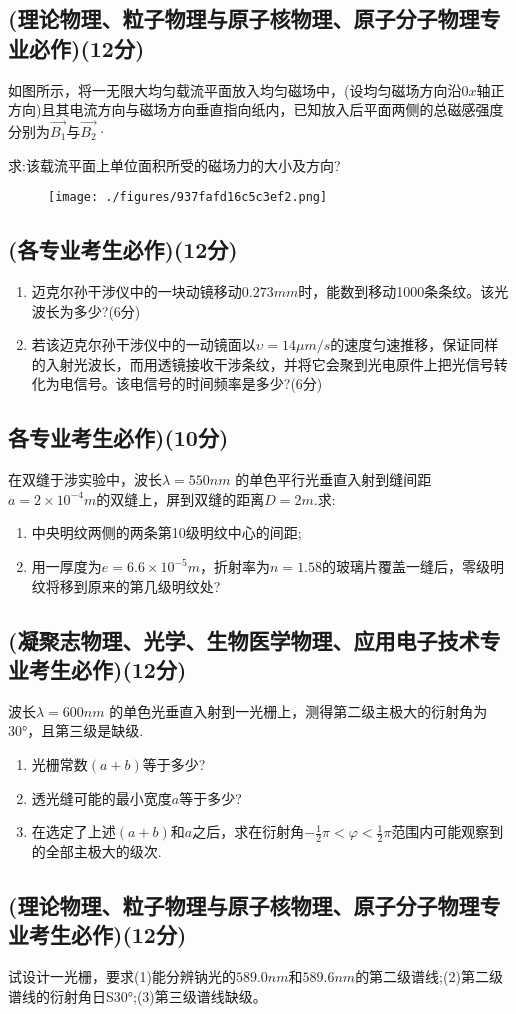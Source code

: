 \subsection{(理论物理、粒子物理与原子核物理、原子分子物理专业必作)(12分)}
如图所示，将一无限大均匀载流平面放入均匀磁场中，(设均匀磁场方向沿$0x$轴正方向)且其电流方向与磁场方向垂直指向纸内，已知放入后平面两侧的总磁感强度分别为$\vec{B_1}$与$\vec{B_2}$·

求:该载流平面上单位面积所受的磁场力的大小及方向?
\begin{figure}[ht]
\centering
\texttt{[image: ./figures/937fafd16c5c3ef2.png]}
\caption{} \label{fig_CD07_2}
\end{figure}
\subsection{(各专业考生必作)(12分)}
\begin{enumerate}
\item 迈克尔孙干涉仪中的一块动镜移动$0.273mm$时，能数到移动1000条条纹。该光波长为多少?(6分)
\item 若该迈克尔孙干涉仪中的一动镜面以$\upsilon=14\mu m/s$的速度匀速推移，保证同样的入射光波长，而用透镜接收干涉条纹，并将它会聚到光电原件上把光信号转化为电信号。该电信号的时间频率是多少?(6分)
\end{enumerate}
\subsection{各专业考生必作)(10分)}
在双缝于涉实验中，波长$\lambda=550nm$ 的单色平行光垂直入射到缝间距$a=2\times10^{-4}m$的双缝上，屏到双缝的距离$D=2m$.求:
\begin{enumerate}
\item 中央明纹两侧的两条第10级明纹中心的间距;
\item 用一厚度为$e=6.6\times10^{-5}m$，折射率为$n=1.58$的玻璃片覆盖一缝后，零级明纹将移到原来的第几级明纹处?
\end{enumerate}
\subsection{(凝聚志物理、光学、生物医学物理、应用电子技术专业考生必作)(12分)}
波长$\lambda=600nm$ 的单色光垂直入射到一光栅上，测得第二级主极大的衍射角为 30°，且第三级是缺级.
\begin{enumerate}
\item 光栅常数$(a+b)$等于多少?
\item 透光缝可能的最小宽度$a$等于多少?
\item 在选定了上述$(a+b)$和$a$之后，求在衍射角$-\frac{1}{2}\pi<\varphi<\frac{1}{2}\pi$范围内可能观察到的全部主极大的级次.
\end{enumerate}
\subsection{(理论物理、粒子物理与原子核物理、原子分子物理专业考生必作)(12分)}
试设计一光栅，要求(1)能分辨钠光的$589.0nm$和$589.6nm$的第二级谱线;(2)第二级谱线的衍射角日S30°;(3)第三级谱线缺级。